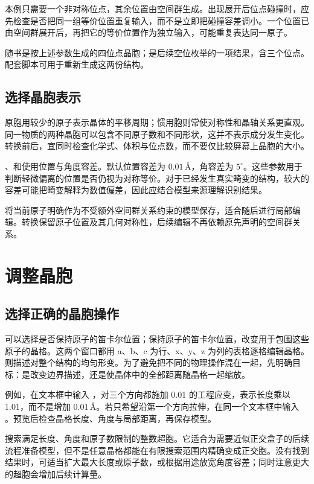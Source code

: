 本例只需要一个非对称位点，其余位置由空间群生成。出现展开后位点碰撞时，应先检查是否把同一组等价位置重复输入，而不是立即把碰撞容差调小。一个位置已由空间群展开后，再把它的等价位置作为独立输入，可能重复表达同一原子。

随书是按上述参数生成的四位点晶胞；是后续空位枚举的一项结果，含三个位点。配套脚本可用于重新生成这两份结构。

\subsection{选择晶胞表示}

原胞用较少的原子表示晶体的平移周期；惯用胞则常使对称性和晶轴关系更直观。同一物质的两种晶胞可以包含不同原子数和不同形状，这并不表示成分发生变化。转换前后，宜同时检查化学式、体积与位点数，而不要仅比较屏幕上晶胞的大小。

、和使用位置与角度容差。默认位置容差为 $0.01\,\text{\AA}$，角容差为 $5^\circ$。这些参数用于判断轻微偏离的位置是否仍视为对称等价。对于已经发生真实畸变的结构，较大的容差可能把畸变解释为数值偏差，因此应结合模型来源理解识别结果。

将当前原子明确作为不受额外空间群关系约束的模型保存，适合随后进行局部编辑。转换保留原子位置及其几何对称性，后续编辑不再依赖原先声明的空间群关系。

\section{调整晶胞}

\subsection{选择正确的晶胞操作}

可以选择是否保持原子的笛卡尔位置；保持原子的笛卡尔位置，改变用于包围这些原子的晶格。这两个窗口都用 a、b、c 为行、x、y、z 为列的表格逐格编辑晶格。则描述对整个结构的均匀形变。为了避免把不同的物理操作混在一起，先明确目标：是改变边界描述，还是使晶体中的全部距离随晶格一起缩放。

例如，在文本框中输入 ，对三个方向都施加 0.01 的工程应变，表示长度乘以 1.01，而不是增加 $0.01\,\text{\AA}$。若只希望沿第一个方向拉伸，在同一个文本框中输入 。预览后检查晶格长度、角度与局部距离，再保存模型。

搜索满足长度、角度和原子数限制的整数超胞。它适合为需要近似正交盒子的后续流程准备模型，但不是任意晶格都能在有限搜索范围内精确变成正交胞。没有找到结果时，可适当扩大最大长度或原子数，或根据用途放宽角度容差；同时注意更大的超胞会增加后续计算量。

